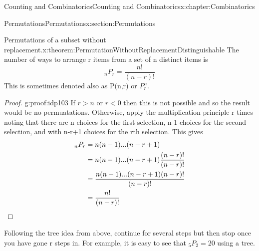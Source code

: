 \documentclass[oneside,10pt,]{book}
\newcommand{\qedhere}{\relax}
\numberwithin{equation}{section}
\newcommand{\lt}{<}
\newcommand{\gt}{>}
\begin{document}
\begin{chapterptx}{Counting and Combinatorics}{}{Counting and Combinatorics}{}{}{x:chapter:Combinatorics}
\begin{sectionptx}{Permutations}{}{Permutations}{}{}{x:section:Permutations}
\begin{theorem}{Permutations of a subset without replacement.}{}{x:theorem:PermutationWithoutReplacementDistinguishable}
The number of ways to arrange r items from a set of n distinct items is%
\begin{equation*}
_nP_r = \frac{n!}{(n-r)!} 
\end{equation*}
This is sometimes denoted also as P(n,r) or \(P_r^n\).%
\end{theorem}
\begin{proof}{}{g:proof:idp103}
If \(r \gt n\) or \(r \lt 0 \) then this is not possible and so the result would be no permuatations. Otherwise, apply the multiplication principle r times noting that there are n choices for the first selection, n-1 choices for the second selection, and with n-r+1 choices for the rth selection. This gives%
\begin{align*}
_nP_r & = n(n-1) ... (n-r+1)\\
& = n(n-1) ... (n-r+1)\frac{(n-r)!}{(n-r)!}\\
& = \frac{n(n-1) ... (n-r+1)(n-r)!}{(n-r)!}\\
& = \frac{n!}{(n-r)!}\qedhere
\end{align*}
%
\end{proof}
Following the tree idea from above, continue for several steps but then stop once you have gone r steps in.  For example, it is easy to see that \(_5P_2 = 20\) using a tree. \begin{image}{0.25}{0.5}{0.25}%

\end{image}
\end{sectionptx}
\end{chapterptx}
\end{document}
